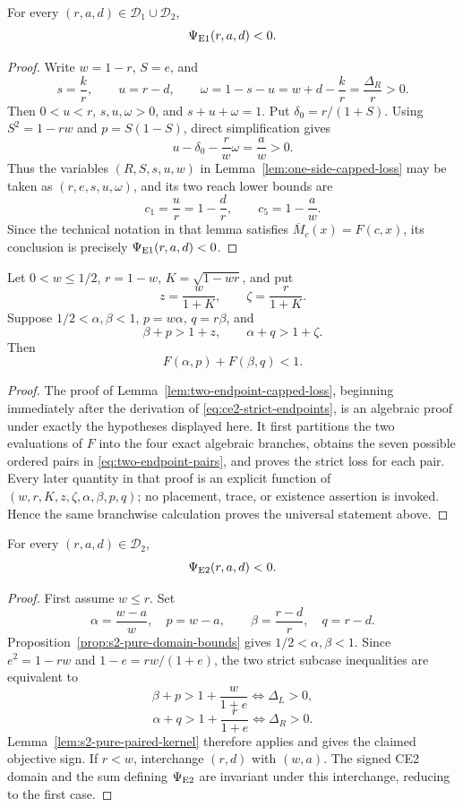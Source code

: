 \begin{theorem}[Pure S2-E1]
\label{thm:s2-univ-e1}
For every $(r,a,d)\in\mathcal D_1\cup\mathcal D_2$,
\[
 \Psi_{\rm E1}(r,a,d)<0.
\]
\end{theorem}

\begin{proof}
Write $w=1-r$, $S=e$, and
\[
 s=\frac{k}{r},\qquad u=r-d,\qquad
 \omega=1-s-u=w+d-\frac{k}{r}=\frac{\Delta_R}{r}>0.
\]
Then $0<u<r$, $s,u,\omega>0$, and $s+u+\omega=1$.  Put
$\delta_0=r/(1+S)$.  Using $S^2=1-rw$ and
$p=S(1-S)$, direct simplification gives
\[
 u-\delta_0-\frac r w\omega=\frac a w>0.
\]
Thus the variables $(R,S,s,u,w)$ in
Lemma~\ref{lem:one-side-capped-loss} may be taken as
$(r,e,s,u,\omega)$, and its two reach lower bounds are
\[
 c_1=\frac ur=1-\frac dr,
 \qquad
 c_5=1-\frac a w.
\]
Since the technical notation in that lemma satisfies
$\overline M_c(x)=F(c,x)$, its conclusion is precisely
$\Psi_{\rm E1}(r,a,d)<0$.
\end{proof}

\begin{lemma}
\label{lem:s2-pure-paired-kernel}
Let $0<w\le1/2$, $r=1-w$, $K=\sqrt{1-wr}$, and put
\[
 z=\frac{w}{1+K},\qquad \zeta=\frac{r}{1+K}.
\]
Suppose $1/2<\alpha,\beta<1$, $p=w\alpha$, $q=r\beta$, and
\[
 \beta+p>1+z,
 \qquad
 \alpha+q>1+\zeta.
\]
Then
\[
 F(\alpha,p)+F(\beta,q)<1.
\]
\end{lemma}

\begin{proof}
The proof of Lemma~\ref{lem:two-endpoint-capped-loss}, beginning immediately
after the derivation of \eqref{eq:ce2-strict-endpoints}, is an algebraic
proof under exactly the hypotheses displayed here.  It first partitions the
two evaluations of $F$ into the four exact algebraic branches, obtains the seven
possible ordered pairs in \eqref{eq:two-endpoint-pairs}, and proves the strict
loss for each pair.  Every later quantity in that proof is an explicit
function of $(w,r,K,z,\zeta,\alpha,\beta,p,q)$; no placement, trace, or
existence assertion is invoked.  Hence the same branchwise calculation proves
the universal statement above.
\end{proof}

\begin{theorem}[Pure S2-E2]
\label{thm:s2-univ-e2}
For every $(r,a,d)\in\mathcal D_2$,
\[
 \Psi_{\rm E2}(r,a,d)<0.
\]
\end{theorem}

\begin{proof}
First assume $w\le r$.  Set
\[
 \alpha=\frac{w-a}{w},\quad p=w-a,
 \qquad
 \beta=\frac{r-d}{r},\quad q=r-d.
\]
Proposition~\ref{prop:s2-pure-domain-bounds} gives
$1/2<\alpha,\beta<1$.  Since $e^2=1-rw$ and
$1-e=rw/(1+e)$, the two strict subcase inequalities are equivalent to
\[
 \beta+p>1+\frac{w}{1+e}
 \iff \Delta_L>0,
\]
\[
 \alpha+q>1+\frac{r}{1+e}
 \iff \Delta_R>0.
\]
Lemma~\ref{lem:s2-pure-paired-kernel} therefore applies and gives the claimed
objective sign.  If $r<w$, interchange
$(r,d)$ with $(w,a)$.  The signed CE2 domain and the sum defining
$\Psi_{\rm E2}$ are invariant under this interchange, reducing to the first
case.
\end{proof}

